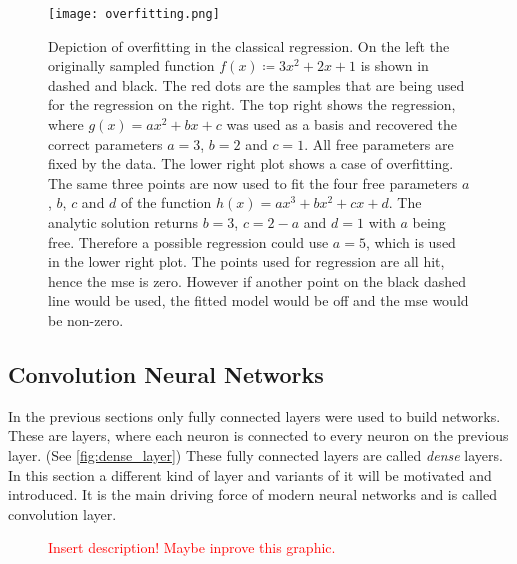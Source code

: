 \begin{figure}
\centering
\texttt{[image: overfitting.png]}
\caption[Overfitting]{Depiction of overfitting in the classical regression. On the left the originally sampled function $f(x)\coloneqq 3x^2 + 2x + 1$ is shown in dashed and black. The red dots are the samples that are being used for the regression on the right. The top right shows the regression, where $g(x)=a x^2 + b x + c$ was used as a basis and recovered the correct parameters $a=3$, $b=2$ and $c=1$. All free parameters are fixed by the data. The lower right plot shows a case of overfitting. The same three points are now used to fit the four free parameters $a$, $b$, $c$ and $d$ of the function $h(x)=a x^3 + b x^2 + c x + d$. The analytic solution returns $b=3$, $c=2-a$ and $d=1$ with $a$ being free. Therefore a possible regression could use $a=5$, which is used in the lower right plot. The points used for regression are all hit, hence the \gls{mse} is zero. However if another point on the black dashed line would be used, the fitted model would be off and the \gls{mse} would be non-zero.}\label{fig:overfitting}
\end{figure}

\subsection{Convolution Neural Networks}\label{sec:cnn}
In the previous sections only fully connected layers were used to build networks. These are layers, where each neuron is connected to every neuron on the previous layer. (See \autoref{fig:dense_layer}) These fully connected layers are called \emph{dense} layers. In this section a different kind of layer and variants of it will be motivated and introduced. It is the main driving force of modern neural networks and is called convolution layer.
\begin{figure}
\centering

\caption[Dense layer]{\textcolor{red}{Insert description! Maybe inprove this graphic.}}\label{fig:dense_layer}
\end{figure}

